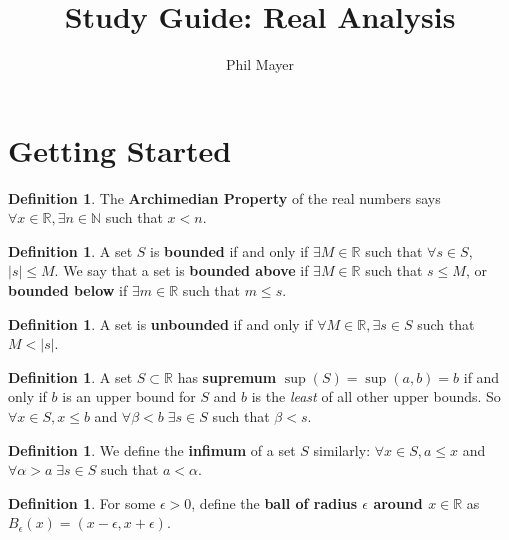 \documentclass[11pt]{amsart}
\title{Study Guide: Real Analysis}
\author{Phil Mayer}
\theoremstyle{definition}
\newtheorem{definition}[theorem]{Definition}
\newcommand{\reals}{\mathbb{R}}
\newcommand{\naturals}{\mathbb{N}}
\begin{document}
\maketitle

\section{Getting Started}
\begin{definition}
	The \textbf{Archimedian Property} of the real numbers says $\forall x \in \reals, \exists n \in \naturals$ such that $x < n$.
\end{definition}
\begin{definition}
	A set $S$ is \textbf{bounded} if and only if $\exists M \in \reals$ such that $\forall s \in S$, $|s| \leq M$. We say that a set is
	\textbf{bounded above} if $\exists M \in \reals$ such that $s \leq M$, or \textbf{bounded below} if $\exists m \in \reals$ such that $m \leq s$.
\end{definition}
\begin{definition}
	A set is \textbf{unbounded} if and only if $\forall M \in \reals, \exists s \in S$ such that $M < |s|$.
\end{definition}
\begin{definition}
	A set $S \subset \reals$ has \textbf{supremum} $\sup(S) = \sup(a, b) = b$ if and only if $b$ is an upper bound for $S$ and $b$ is the
	\textit{least} of all other upper bounds. So $\forall x \in S, x \leq b$ and $\forall \beta < b \; \exists s \in S$ such that $\beta < s$.
\end{definition}
\begin{definition}
	We define the \textbf{infimum} of a set $S$ similarly: $\forall x \in S, a \leq x$ and 
	\newline
	$\forall \alpha > a \; \exists s \in S$ such that $a < \alpha$.	
\end{definition}
\begin{definition}
	For some $\epsilon > 0$, define the \textbf{ball of radius $\epsilon$ around $x \in \reals$} as $B_{\epsilon}(x) = (x - \epsilon, x + \epsilon)$.
\end{definition}
\end{document}
